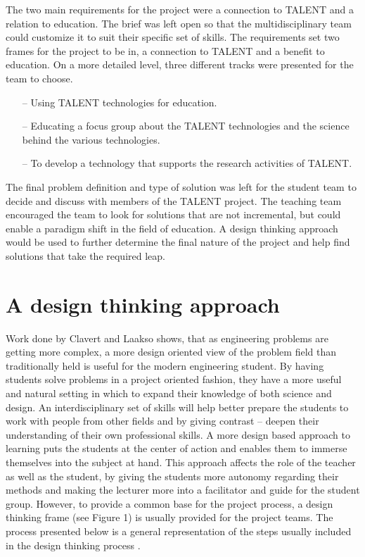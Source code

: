 \documentclass[english,12pt,a4paper,pdftex]{article}
\begin{document}
The two main requirements for the project were a connection to TALENT and a relation to education. The brief was left  open so that the multidisciplinary team could customize it to suit their specific set of skills. The requirements set  two frames for the project to be in, a connection to TALENT and a benefit to education. On a more detailed level, three different tracks were presented for the team to choose.

\begin{itemize}
\item[--]Using TALENT technologies for education.
\item[--]Educating a focus group about the TALENT technologies and the science behind the various technologies.
\item[--]To develop a technology that supports the research activities of TALENT.
\end{itemize}

The final problem definition and type of solution was left for the student team to decide and discuss with members of the TALENT project. The teaching team encouraged the team to look for solutions that are not incremental, but could enable a paradigm shift in the field of education. A design thinking approach would be used to further determine the final nature of the project and help find solutions that take the required leap.


\clearpage

\section{A design thinking approach}

Work done by Clavert and Laakso \cite{Clavert} shows, that as engineering problems are getting more complex, a more design oriented view of the problem field than traditionally held is useful for the modern engineering student. By having students solve problems in a project oriented fashion, they have a more useful and natural setting in which to expand their knowledge of both science and design. An interdisciplinary set of skills will help better prepare the students to work with people from other fields and by giving contrast -- deepen their understanding of their own professional skills. A more design based approach to learning puts the students at the center of action and enables them to immerse themselves into the subject at hand. This approach affects the role of the teacher as well as the student, by giving the students more autonomy regarding their methods and making the lecturer more into a facilitator and guide for the student group. However, to provide a common base for the project process, a design thinking frame (see Figure 1) is usually provided for the project teams. The process presented below is a general representation of the steps usually included in the design thinking process \cite{Brown}. 
\end{document}

